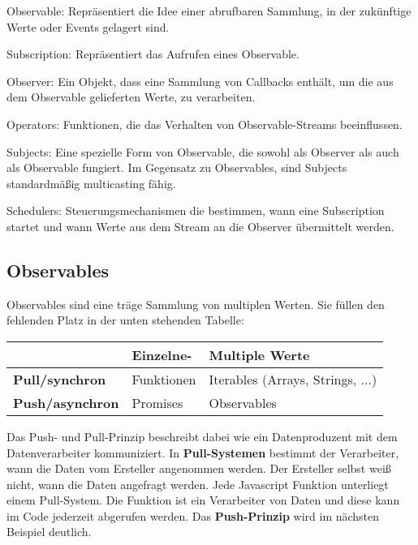 \begin{description}
    \item Observable: Repräsentiert die Idee einer abrufbaren Sammlung, in der zukünftige Werte oder Events gelagert sind.
    \item Subscription: Repräsentiert das Aufrufen eines Observable.
    \item Observer: Ein Objekt, dass eine Sammlung von Callbacks enthält, um die aus dem Observable gelieferten Werte, zu verarbeiten.
    \item Operators: Funktionen, die das Verhalten von Observable-Streams beeinflussen.
    \item Subjects: Eine spezielle Form von Observable, die sowohl als Observer als auch als Observable fungiert. Im Gegensatz zu Observables, sind Subjects standardmäßig multicasting fähig.
    \item Schedulers: Steuerungsmechanismen die bestimmen, wann eine Subscription startet und wann Werte aus dem Stream an die Observer übermittelt werden.
\end{description}


\subsection{Observables}

Observables sind eine träge Sammlung von multiplen Werten. Sie füllen den fehlenden Platz in der unten stehenden Tabelle:

\begin{center}
    \begin{tabular}{| l | l | l |}
    \hline
    & \textbf{Einzelne-} & \textbf{Multiple Werte} \\ \hline
    \textbf{Pull/synchron} & Funktionen & Iterables (Arrays, Strings, ...) \\ \hline
    \textbf{Push/asynchron} & Promises & Observables  \\ \hline
    \end{tabular}
\end{center}

\noindent
Das Push- und Pull-Prinzip beschreibt dabei wie ein Datenproduzent mit dem Datenverarbeiter kommuniziert. In \textbf{Pull-Systemen} bestimmt der Verarbeiter, wann die Daten vom Ersteller angenommen werden. Der Ersteller selbst weiß nicht, wann die Daten angefragt werden. Jede Javascript Funktion unterliegt einem Pull-System. Die Funktion ist ein Verarbeiter von Daten und diese kann im Code jederzeit abgerufen werden. Das \textbf{Push-Prinzip} wird im nächsten Beispiel deutlich. 

